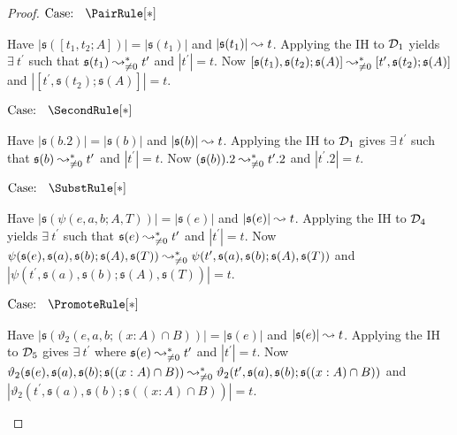 \begin{proof}
    $\text{Case: }\begin{array}{c} \PairRule[*] \end{array}$
    \begin{proofcase}
        Have $|\mathfrak{s}([t_1, t_2; A])| = |\mathfrak{s}(t_1)|$ and $|\mathfrak{s}(t_1)| \leadsto t$.
        Applying the IH to $\mathcal{D}_{1}$ yields $\exists\ t^\prime$ such that $\mathfrak{s}(t_1) \leadsto^*_{\neq 0} t^\prime$ and $|t^\prime| = t$.
        Now $[\mathfrak{s}(t_1), \mathfrak{s}(t_2); \mathfrak{s}(A)] \leadsto^*_{\neq 0} [t^\prime, \mathfrak{s}(t_2); \mathfrak{s}(A)]$ and $|[t^\prime, \mathfrak{s}(t_2); \mathfrak{s}(A)]| = t$.
    \end{proofcase}

    $\text{Case: }\begin{array}{c} \SecondRule[*] \end{array}$
    \begin{proofcase}
        Have $|\mathfrak{s}(b.2)| = |\mathfrak{s}(b)|$ and $|\mathfrak{s}(b)| \leadsto t$.
        Applying the IH to $\mathcal{D}_{1}$ gives $\exists\ t^\prime$ such that $\mathfrak{s}(b) \leadsto^*_{\neq 0} t^\prime$ and $|t^\prime| = t$.
        Now $(\mathfrak{s}(b)).2 \leadsto^*_{\neq 0} t^\prime.2$ and $|t^\prime.2| = t$.
    \end{proofcase}

    $\text{Case: }\begin{array}{c} \SubstRule[*] \end{array}$
    \begin{proofcase}
        Have $|\mathfrak{s}(\psi(e, a, b; A, T))| = |\mathfrak{s}(e)|$ and $|\mathfrak{s}(e)| \leadsto t$.
        Applying the IH to $\mathcal{D}_{4}$ yields $\exists\ t^\prime$ such that $\mathfrak{s}(e) \leadsto^*_{\neq 0} t^\prime$ and $|t^\prime| = t$.
        Now $\psi(\mathfrak{s}(e), \mathfrak{s}(a), \mathfrak{s}(b); \mathfrak{s}(A), \mathfrak{s}(T)) \leadsto^*_{\neq 0} \psi(t^\prime, \mathfrak{s}(a), \mathfrak{s}(b); \mathfrak{s}(A), \mathfrak{s}(T))$
            and $|\psi(t^\prime, \mathfrak{s}(a), \mathfrak{s}(b); \mathfrak{s}(A), \mathfrak{s}(T))| = t$.
    \end{proofcase}

    $\text{Case: }\begin{array}{c} \PromoteRule[*] \end{array}$
    \begin{proofcase}
        Have $|\mathfrak{s}(\vartheta_2(e, a, b; (x : A) \cap B))| = |\mathfrak{s}(e)|$ and $|\mathfrak{s}(e)| \leadsto t$.
        Applying the IH to $\mathcal{D}_{5}$ gives $\exists\ t^\prime$ where $\mathfrak{s}(e) \leadsto^*_{\neq 0} t^\prime$ and $|t^\prime| = t$.
        Now $\vartheta_2(\mathfrak{s}(e), \mathfrak{s}(a), \mathfrak{s}(b); \mathfrak{s}((x : A) \cap B)) \leadsto^*_{\neq 0} \vartheta_2(t^\prime, \mathfrak{s}(a), \mathfrak{s}(b); \mathfrak{s}((x : A) \cap B))$
            and $|\vartheta_2(t^\prime, \mathfrak{s}(a), \mathfrak{s}(b); \mathfrak{s}((x : A) \cap B))| = t$.
    \end{proofcase}


\end{proof}

